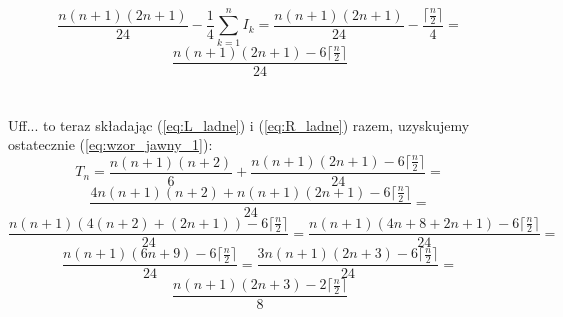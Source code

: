 \documentclass[a4paper,11pt]{article}
\begin{document}
\[
  \frac{n(n+1)(2n+1)}{24} - \frac{1}{4} \sum_{k=1}^{n} I_{k} = \frac{n(n+1)(2n+1)}{24} - \frac{\lceil \frac{n}{2} \rceil}{4} = 
\]
\begin{equation}
  \frac{n(n+1)(2n+1) - 6\lceil \frac{n}{2} \rceil}{24}  \label{eq:R_ladne}
\end{equation} \\ \\


Uff... to teraz składając (\ref{eq:L_ladne}) i (\ref{eq:R_ladne}) razem, uzyskujemy ostatecznie (\ref{eq:wzor_jawny_1}):
\[
  T_{n} = \frac{n(n+1)(n+2)}{6} + \frac{n(n+1)(2n+1) - 6\lceil \frac{n}{2} \rceil}{24} =
\]
\[
  \frac{4n(n+1)(n+2) + n(n+1)(2n+1) - 6\lceil \frac{n}{2} \rceil}{24} =
\]
\[
  \frac{n(n+1)(4(n+2) + (2n+1)) - 6\lceil \frac{n}{2} \rceil}{24} =
  \frac{n(n+1)(4n+8 + 2n+1) - 6\lceil \frac{n}{2} \rceil}{24} =
\]
\[
  \frac{n(n+1)(6n+9) - 6\lceil \frac{n}{2} \rceil}{24} =
  \frac{3n(n+1)(2n+3) - 6\lceil \frac{n}{2} \rceil}{24} =
\]
\[
  \frac{n(n+1)(2n+3) - 2\lceil \frac{n}{2} \rceil}{8}
\]
\end{document}
